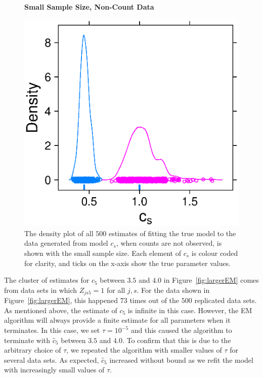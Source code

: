 \documentclass[12pt]{article}
\begin{document}
\begin{figure}
  \textbf{Small Sample Size, Non-Count Data}\par
  \centering
  \includegraphics[scale=0.75]{smallEM}
  \caption{The density plot of all $500$ estimates of fitting the true model to the data generated from model $c_s$, when counts are not observed, is shown with the small sample size.  Each element of $c_s$ is colour coded for clarity, and ticks on the x-axis show the true parameter values.}
  \label{fig:smallEM}
\end{figure}

The cluster of estimates for $c_5$ between $3.5$ and $4.0$ in Figure~\ref{fig:largerEM} comes from data sets in which $Z_{js5}=1$ for all $j,s$.  For the data shown in Figure~\ref{fig:largerEM}, this happened $73$ times out of the $500$ replicated data sets.  As mentioned above, the estimate of $c_5$ is infinite in this case.  However, the EM algorithm will always provide a finite estimate for all parameters when it terminates.  In this case, we set $\tau=10^{-5}$ and this caused the algorithm to terminate with $\hat c_5$ between $3.5$ and $4.0$.  To confirm that this is due to the arbitrary choice of $\tau$, we repeated the algorithm with smaller values of $\tau$ for several data sets. As expected, $\hat c_5$ increased without bound as we refit the model with increasingly small values of $\tau$.
\end{document}
